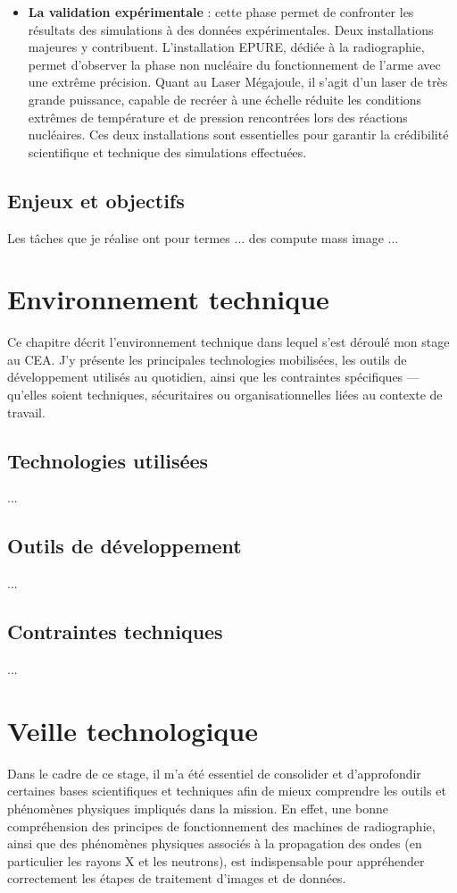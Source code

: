 \documentclass[12pt,a4paper]{report}
\begin{document}
\begin{itemize}
\item \textbf{La validation expérimentale} : cette phase permet de confronter les résultats des simulations à des données expérimentales. Deux installations majeures y contribuent. L’installation EPURE, dédiée à la radiographie, permet d’observer la phase non nucléaire du fonctionnement de l’arme avec une extrême précision. Quant au Laser Mégajoule, il s’agit d’un laser de très grande puissance, capable de recréer à une échelle réduite les conditions extrêmes de température et de pression rencontrées lors des réactions nucléaires. Ces deux installations sont essentielles pour garantir la crédibilité scientifique et technique des simulations effectuées.
\end{itemize}

\section{Enjeux et objectifs}
Les tâches que je réalise ont pour termes ... des compute mass image ...


\chapter{Environnement technique}

Ce chapitre décrit l’environnement technique dans lequel s’est déroulé mon stage au CEA. J’y présente les principales technologies mobilisées, les outils de développement utilisés au quotidien, ainsi que les contraintes spécifiques — qu’elles soient techniques, sécuritaires ou organisationnelles liées au contexte de travail.

\section{Technologies utilisées}
... %

\section{Outils de développement}
... %

\section{Contraintes techniques}
... %

\chapter{Veille technologique}
Dans le cadre de ce stage, il m’a été essentiel de consolider et d’approfondir certaines bases scientifiques et techniques afin de mieux comprendre les outils et phénomènes physiques impliqués dans la mission. En effet, une bonne compréhension des principes de fonctionnement des machines de radiographie, ainsi que des phénomènes physiques associés à la propagation des ondes (en particulier les rayons X et les neutrons), est indispensable pour appréhender correctement les étapes de traitement d’images et de données.
\end{document}
